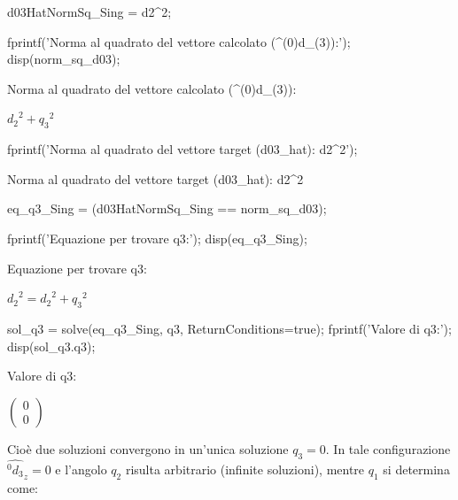 \documentclass[11pt, a4paper]{article}
\begin{document}
\begin{matlabcode}
d03HatNormSq_Sing = d2^2;

fprintf('Norma al quadrato del vettore calcolato (^(0)d_(3)):');
disp(norm_sq_d03);
\end{matlabcode}
\begin{matlaboutput}
Norma al quadrato del vettore calcolato (^(0)d_(3)):
\end{matlaboutput}
\begin{matlabsymbolicoutput}
$\displaystyle {d_2 }^2 +{q_3 }^2 $
\end{matlabsymbolicoutput}
\newpage
\begin{matlabcode}
fprintf('Norma al quadrato del vettore target (d03_hat): d2^2');
\end{matlabcode}
\begin{matlaboutput}
Norma al quadrato del vettore target (d03_hat): d2^2
\end{matlaboutput}
\begin{matlabcode}
eq_q3_Sing = (d03HatNormSq_Sing == norm_sq_d03);

fprintf('Equazione per trovare q3:');
disp(eq_q3_Sing);
\end{matlabcode}
\begin{matlaboutput}
Equazione per trovare q3:
\end{matlaboutput}
\begin{matlabsymbolicoutput}
$\displaystyle {d_2 }^2 ={d_2 }^2 +{q_3 }^2 $
\end{matlabsymbolicoutput}
\begin{matlabcode}

sol_q3 = solve(eq_q3_Sing, q3, ReturnConditions=true);
fprintf('Valore di q3:');
disp(sol_q3.q3);
\end{matlabcode}
\begin{matlaboutput}
Valore di q3:
\end{matlaboutput}
\begin{matlabsymbolicoutput}
$\displaystyle \left(\begin{array}{c}
0\\
0
\end{array}\right)$
\end{matlabsymbolicoutput}

\begin{par}
\begin{flushleft}
Cioè due soluzioni convergono in un'unica soluzione $q_3 =0$. In tale configurazione ${\hat{^0 d_3 } }_z =0$ e l'angolo $q_2$ risulta arbitrario (infinite soluzioni), mentre $q_1$ si determina come:
\end{flushleft}
\end{par}
\end{document}
